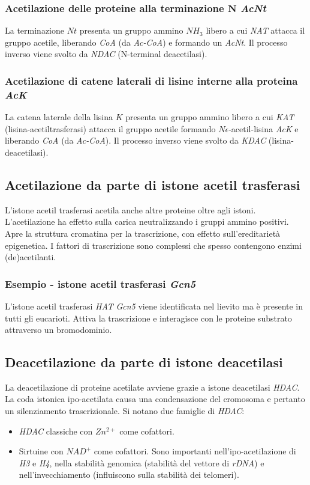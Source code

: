 		\subsubsection{Acetilazione delle proteine alla terminazione $\mathbf{N}$ \emph{AcNt}}
		La terminazione $Nt$ presenta un gruppo ammino \emph{$NH_3$} libero a cui \emph{NAT} attacca il gruppo acetile, liberando \emph{CoA} (da \emph{Ac-CoA}) e formando un \emph{AcNt}. 
		Il processo inverso viene svolto da \emph{NDAC} (N-terminal deacetilasi). 

		\subsubsection{Acetilazione di catene laterali di lisine interne alla proteina \emph{AcK}}
		La catena laterale della lisina $K$ presenta un gruppo ammino libero a cui \emph{KAT} (lisina-acetiltrasferasi) attacca il gruppo acetile formando $N\epsilon$-acetil-lisina \emph{AcK} e liberando \emph{CoA} (da \emph{Ac-CoA}).
		Il processo inverso viene svolto da \emph{KDAC} (lisina-deacetilasi).

	\subsection{Acetilazione da parte di istone acetil trasferasi}
	L'istone acetil trasferasi acetila anche altre proteine oltre agli istoni. 
	L'acetilazione ha effetto sulla carica neutralizzando i gruppi ammino positivi. 
	Apre la struttura cromatina per la trascrizione, con effetto sull'ereditariet\`a epigenetica.
	I fattori di trascrizione sono complessi che spesso contengono enzimi (de)acetilanti.
		
		\subsubsection{Esempio - istone acetil trasferasi \emph{Gcn5}}
		L'istone acetil trasferasi \emph{HAT} \emph{Gcn5} viene identificata nel lievito ma \`e presente in tutti gli eucarioti.
		Attiva la trascrizione e interagisce con le proteine substrato attraverso un bromodominio.

	\subsection{Deacetilazione da parte di istone deacetilasi}
	La deacetilazione di proteine acetilate avviene grazie a istone deacetilasi \emph{HDAC}.
	La coda istonica ipo-acetilata causa una condensazione del cromosoma e pertanto un silenziamento trascrizionale. 
	Si notano due famiglie di \emph{HDAC}:
	\begin{itemize}
		\item \emph{HDAC} classiche con \emph{$Zn^{2+}$} come cofattori.
		\item Sirtuine con \emph{$NAD^+$} come cofattori.
			Sono importanti nell'ipo-acetilazione di \emph{H3} e \emph{H4}, nella stabilit\`a genomica (stabilit\`a del vettore di \emph{rDNA}) e nell'invecchiamento (influiscono sulla stabilit\`a dei telomeri).
	\end{itemize}

